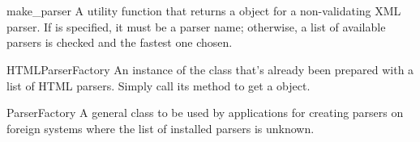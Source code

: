 \documentclass{howto}
\begin{document}



\section{}

\begin{funcdesc}{make_parser}{}
A utility function that returns a  object for a
non-validating XML parser.  If  is specified, it must be a 
parser name; otherwise, a list of available parsers is checked and the
fastest one chosen.
\end{funcdesc}

\begin{datadesc}{HTMLParserFactory}
An instance of the  class that's already been
prepared with a list of HTML parsers.  Simply call its
 method to get a  object. 
\end{datadesc}

\begin{classdesc}{ParserFactory}{}
A general class to be used by applications for creating parsers on
foreign systems where the list of installed parsers is unknown.
\end{classdesc}
\end{document}

